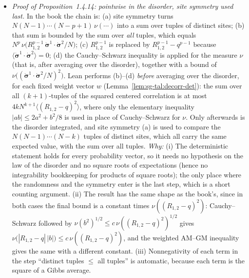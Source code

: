 \begin{remark}
\begin{itemize}
\item \emph{Proof of Proposition~1.4.14: pointwise in the disorder, site symmetry used last.}
In the book the chain is: (a) site symmetry turns $N(N-1)\cdots(N-p+1)\,\nu(\cdots)$ into a sum over tuples of distinct sites; (b) that sum is bounded by the sum over \emph{all} tuples, which equals $N^p\,\nu\big(R_{1,2}^{p-1}\,\dot{\boldsymbol\sigma}^1\!\cdot\dot{\boldsymbol\sigma}^2/N\big)$; (c) $R_{1,2}^{p-1}$ is replaced by $R_{1,2}^{p-1}-q^{p-1}$ because $\langle\dot{\boldsymbol\sigma}^1\!\cdot\dot{\boldsymbol\sigma}^2\rangle=0$; (d) the Cauchy--Schwarz inequality is applied for the measure $\nu$ (that is, after averaging over the disorder), together with a bound of $\nu\big((\dot{\boldsymbol\sigma}^1\!\cdot\dot{\boldsymbol\sigma}^2/N)^2\big)$.
Lean performs (b)--(d) \emph{before} averaging over the disorder, for each fixed weight vector $w$ (Lemma~\ref{lem:sg-tal:decorr-det}): the sum over all $(k+1)$-tuples of the squared centered correlation is at most $4kN^{k+1}\langle(R_{1,2}-q)^2\rangle$, where only the elementary inequality $|ab|\le 2a^2+b^2/8$ is used in place of Cauchy--Schwarz for $\nu$. Only afterwards is the disorder integrated, and site symmetry (a) is used to compare the $N(N-1)\cdots(N-k)$ tuples of distinct sites, which all carry the same expected value, with the sum over all tuples.
\emph{Why:} (i) The deterministic statement holds for every probability vector, so it needs no hypothesis on the law of the disorder and no square roots of expectations (hence no integrability bookkeeping for products of square roots); the only place where the randomness and the symmetry enter is the last step, which is a short counting argument. (ii) The result has the same shape as the book's, since in both cases the final bound is a constant times $\nu((R_{1,2}-q)^2)$: Cauchy--Schwarz followed by $\nu(b^2)^{1/2}\le c\,\nu((R_{1,2}-q)^2)^{1/2}$ gives $\nu\big(|R_{1,2}-q|\,|b|\big)\le c\,\nu((R_{1,2}-q)^2)$, and the weighted AM--GM inequality gives the same with a different constant. (iii) Nonnegativity of each term in the step ``distinct tuples $\le$ all tuples'' is automatic, because each term is the square of a Gibbs average.


\end{itemize}
\end{remark}

